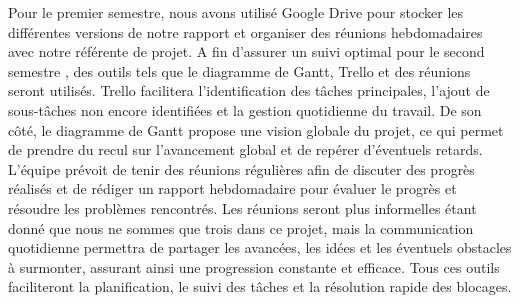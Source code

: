 Pour le premier semestre, nous avons utilisé Google Drive pour stocker les 
différentes versions de notre rapport et organiser des réunions hebdomadaires 
avec notre référente de projet. A fin d'assurer un suivi optimal pour le second semestre , des outils tels que le diagramme de Gantt, 
Trello et des réunions seront utilisés. Trello facilitera l'identification des tâches principales, l'ajout de 
sous-tâches non encore identifiées et la gestion quotidienne du travail. 
De son côté, le diagramme de Gantt propose une vision globale du projet, ce qui 
permet de prendre du recul sur l'avancement global et de repérer d'éventuels 
retards. L'équipe prévoit de tenir des réunions régulières afin de discuter des 
progrès réalisés et de rédiger un rapport hebdomadaire pour évaluer le progrès et 
résoudre les problèmes rencontrés. Les réunions seront plus informelles étant 
donné que nous ne sommes que trois dans ce projet, mais la communication 
quotidienne permettra de partager les avancées, les idées et les éventuels 
obstacles à surmonter, assurant ainsi une progression constante et efficace. 
Tous ces outils faciliteront la planification, le suivi des tâches et la 
résolution rapide des blocages.
